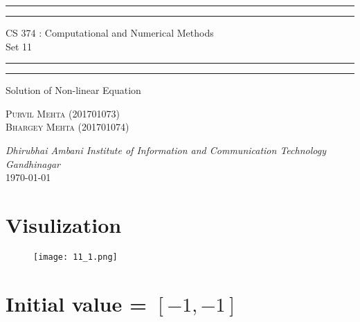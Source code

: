 \documentclass{article}
\begin{document}
\begin{titlepage}
	\centering 
	\scshape
	\vspace*{\baselineskip}
	\rule{\textwidth}{1.6pt}\vspace*{-\baselineskip}\vspace*{2pt}
	\rule{\textwidth}{0.4pt} 
	\vspace{0.75\baselineskip}
	
	{\Large CS 374 : Computational and Numerical Methods \\\vspace{0.75\baselineskip} Set 11}
	\vspace{0.75\baselineskip}
	
	\rule{\textwidth}{0.4pt}\vspace*{-\baselineskip}\vspace{3.2pt} 
	\rule{\textwidth}{1.6pt}
	
	\vspace{2\baselineskip}  
	 Solution of Non-linear Equation
	
	\vspace*{3\baselineskip}
	
	\vspace{0.5\baselineskip} %
	
	{\scshape\large Purvil Mehta (201701073) \\ Bhargey Mehta (201701074) \\} 
	
	\vspace{1\baselineskip} 
	
	\textit{Dhirubhai Ambani Institute of Information and Communication Technology \\ Gandhinagar\\} 
	\vspace*{2\baselineskip}
	\today


\end{titlepage}
\newpage
\section{Visulization}
\begin{figure}[!h]
    \centering
    \texttt{[image: 11\_1.png]}
\end{figure}

\section{Initial value = $[-1 , -1]$}
\begin{table}[!h]
\end{table}
\newpage
\end{document}
